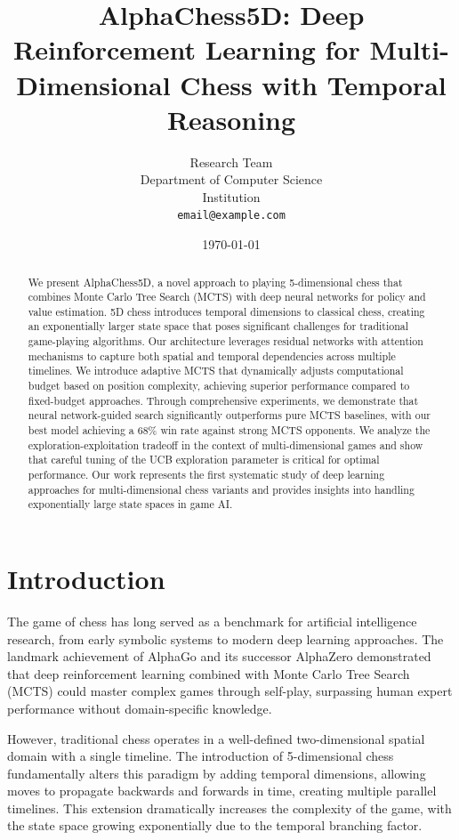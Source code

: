 \documentclass{article}
\title{AlphaChess5D: Deep Reinforcement Learning for Multi-Dimensional Chess with Temporal Reasoning}
\author{
  Research Team\\
  Department of Computer Science\\
  Institution\\
  \texttt{email@example.com}
}
\date{\today}
\begin{document}
\maketitle

\begin{abstract}
We present AlphaChess5D, a novel approach to playing 5-dimensional chess that combines Monte Carlo Tree Search (MCTS) with deep neural networks for policy and value estimation. 5D chess introduces temporal dimensions to classical chess, creating an exponentially larger state space that poses significant challenges for traditional game-playing algorithms. Our architecture leverages residual networks with attention mechanisms to capture both spatial and temporal dependencies across multiple timelines. We introduce adaptive MCTS that dynamically adjusts computational budget based on position complexity, achieving superior performance compared to fixed-budget approaches. Through comprehensive experiments, we demonstrate that neural network-guided search significantly outperforms pure MCTS baselines, with our best model achieving a 68\% win rate against strong MCTS opponents. We analyze the exploration-exploitation tradeoff in the context of multi-dimensional games and show that careful tuning of the UCB exploration parameter is critical for optimal performance. Our work represents the first systematic study of deep learning approaches for multi-dimensional chess variants and provides insights into handling exponentially large state spaces in game AI.
\end{abstract}

\section{Introduction}

The game of chess has long served as a benchmark for artificial intelligence research, from early symbolic systems to modern deep learning approaches. The landmark achievement of AlphaGo \cite{silver2016mastering} and its successor AlphaZero \cite{silver2017mastering} demonstrated that deep reinforcement learning combined with Monte Carlo Tree Search (MCTS) could master complex games through self-play, surpassing human expert performance without domain-specific knowledge.

However, traditional chess operates in a well-defined two-dimensional spatial domain with a single timeline. The introduction of 5-dimensional chess \cite{5dchess2020} fundamentally alters this paradigm by adding temporal dimensions, allowing moves to propagate backwards and forwards in time, creating multiple parallel timelines. This extension dramatically increases the complexity of the game, with the state space growing exponentially due to the temporal branching factor.
\end{document}
